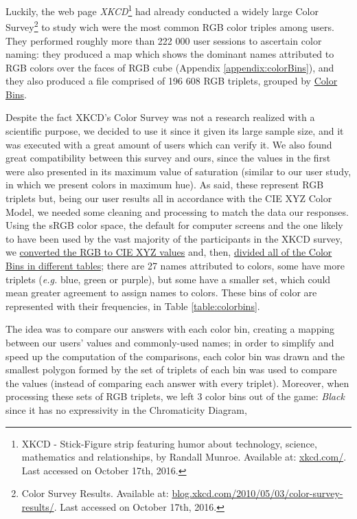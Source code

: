 %
Luckily, the web page \emph{XKCD}\footnote{XKCD - Stick-Figure strip featuring humor about technology, science, mathematics and relationships, by Randall Munroe.
Available at: \url{xkcd.com/}. Last accessed on October 17th, 2016.} had already conducted a widely large Color Survey\footnote{Color Survey Results. Available at:
\url{blog.xkcd.com/2010/05/03/color-survey-results/}. Last accessed on October 17th, 2016.} to study wich were the most common RGB color triples among users. They performed roughly more
than 222 000 user sessions to ascertain color naming: they produced a map which shows the dominant names attributed to \gls{RGB} colors over the faces of \gls{RGB} cube (Appendix \ref{appendix:colorBins}),
and they also produced a file comprised of 196 608 RGB triplets, grouped by \ul{Color Bins}. \par
%
Despite the fact XKCD's Color Survey was not a research realized with a scientific purpose, we decided to use it since it given its large sample size, and it was executed with a great amount of users
which can verify it. We also found great compatibility between this survey and ours, since the values in the first were also presented in its maximum value of saturation (similar to our user study, in which we present colors in maximum hue).
%
As said, these represent \gls{RGB} triplets but, being our user results all in accordance with the CIE XYZ Color Model, we needed some cleaning and processing to match the data our
responses. Using the sRGB color space, the default for computer screens and the one likely to have been used by the vast majority of the participants in the XKCD survey, we
\ul{converted the RGB to CIE XYZ values} and, then, \ul{divided all of the Color Bins in different tables}; there are 27 names attributed to colors, some have more triplets
(\emph{e.g.} blue, green or purple), but some have a smaller set, which could mean greater agreement to assign names to colors. These bins of color are represented with their frequencies, in Table
\ref{table:colorbins}. \par
%
The idea was to compare our answers with each color bin, creating a mapping between our users' values and commonly-used names; in order to simplify and speed up the computation
of the comparisons, each color bin was drawn and the smallest polygon formed by the set of triplets of each bin was used to compare the values (instead of comparing each answer
with every triplet). Moreover, when processing these sets of RGB triplets, we left 3 color bins out of the game: \emph{Black} since it has no expressivity in the Chromaticity Diagram,

